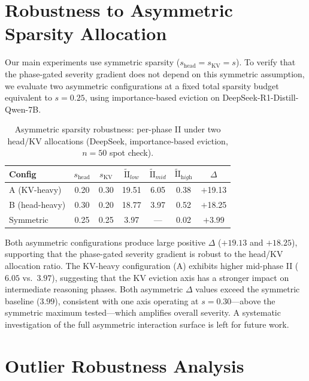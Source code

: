 \section{Robustness to Asymmetric Sparsity Allocation}
\label{app:asymmetric-robustness}

Our main experiments use symmetric sparsity ($s_{\text{head}} = s_{\text{KV}} = s$). To verify that the phase-gated severity gradient does not depend on this symmetric assumption, we evaluate two asymmetric configurations at a fixed total sparsity budget equivalent to $s{=}0.25$, using importance-based eviction on DeepSeek-R1-Distill-Qwen-7B.

\begin{table}[h]
\centering
\small
\caption{Asymmetric sparsity robustness: per-phase II under two head/KV allocations (DeepSeek, importance-based eviction, $n{=}50$ spot check).}
\label{tab:asymmetric-robust}
\begin{tabular}{@{}lcccccc@{}}
\toprule
Config & $s_{\text{head}}$ & $s_{\text{KV}}$ & $\widetilde{\mathrm{II}}_{\textit{low}}$ & $\widetilde{\mathrm{II}}_{\textit{mid}}$ & $\widetilde{\mathrm{II}}_{\textit{high}}$ & $\Delta$ \\
\midrule
A (KV-heavy) & 0.20 & 0.30 & 19.51 & 6.05 & 0.38 & $+$19.13 \\
B (head-heavy) & 0.30 & 0.20 & 18.77 & 3.97 & 0.52 & $+$18.25 \\
\addlinespace
Symmetric & 0.25 & 0.25 & 3.97 & --- & 0.02 & $+$3.99 \\
\bottomrule
\end{tabular}
\end{table}

Both asymmetric configurations produce large positive $\Delta$ ($+19.13$ and $+18.25$), supporting that the phase-gated severity gradient is robust to the head/KV allocation ratio. The KV-heavy configuration (A) exhibits higher mid-phase II ($6.05$ vs.\ $3.97$), suggesting that the KV eviction axis has a stronger impact on intermediate reasoning phases. Both asymmetric $\Delta$ values exceed the symmetric baseline ($3.99$), consistent with one axis operating at $s{=}0.30$---above the symmetric maximum tested---which amplifies overall severity. A systematic investigation of the full asymmetric interaction surface is left for future work.


\section{Outlier Robustness Analysis}
\label{app:outlier-robustness}

